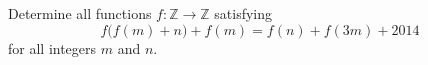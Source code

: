Determine all functions 
$f: \mathbb{Z}\to\mathbb{Z}$
 satisfying 
\[f\big(f(m)+n\big)+f(m)=f(n)+f(3m)+2014\]
 for all integers 
$m$
 and 
$n$.


